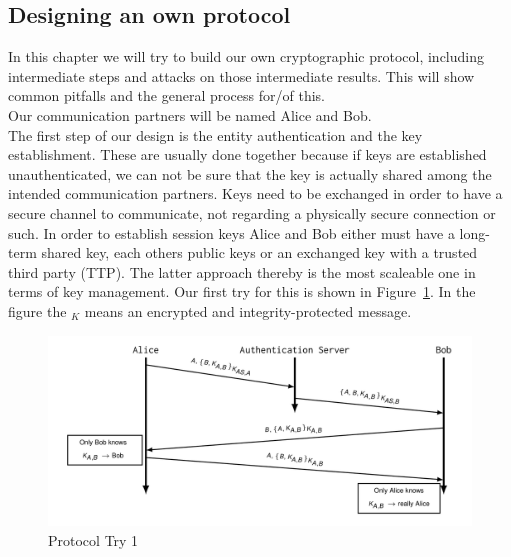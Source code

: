 \subsection{Designing an own protocol}
In this chapter we will try to build our own cryptographic protocol, including intermediate steps and attacks on those intermediate results.
This will show common pitfalls and the general process for/of this.\\
Our communication partners will be named Alice and Bob.\\

The first step of our design is the entity authentication and the key establishment.
These are usually done together because if keys are established unauthenticated, we can not be sure that the key is actually shared among the intended communication partners.
Keys need to be exchanged in order to have a secure channel to communicate, not regarding a physically secure connection or such.
In order to establish session keys Alice and Bob either must have a long-term shared key, each others public keys or an exchanged key with a trusted third party (TTP).
The latter approach thereby is the most scaleable one in terms of key management.
Our first try for this is shown in Figure~\ref{fig:ooppt1}.
In the figure the ${}_K$ means an encrypted and integrity-protected message.\\
\begin{figure}[h]
  \centering
  \includegraphics[width=.8\textwidth]{figures/ooppt1.png}
  \caption{Protocol Try 1}\label{fig:ooppt1}
\end{figure}
\newpage

